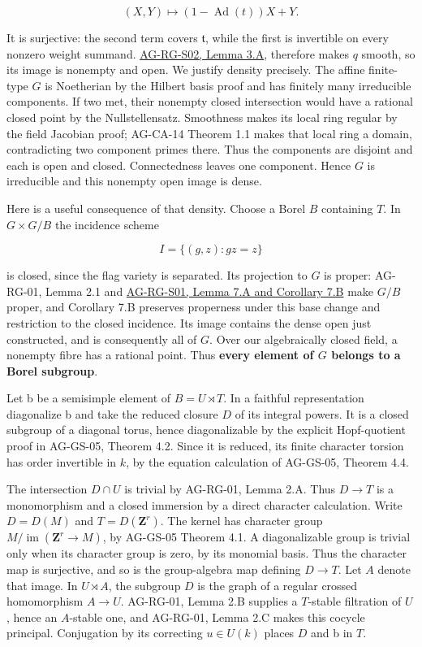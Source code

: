 \documentclass[11pt,a4paper,openany]{report}
\newcounter{none}
\begin{document}
\[
(X,Y)\longmapsto (1-\operatorname{Ad}(t))X+Y.
\]

It is surjective: the second term covers \(\mathfrak t\), while the first is invertible on every nonzero weight summand. \href{AG-RG-S02.html\#smooth-map-differential}{AG-RG-S02, Lemma 3.A}, therefore makes \(q\) smooth, so its image is nonempty and open. We justify density precisely. The affine finite-type \(G\) is Noetherian by the Hilbert basis proof and has finitely many irreducible components. If two met, their nonempty closed intersection would have a rational closed point by the Nullstellensatz. Smoothness makes its local ring regular by the field Jacobian proof; AG-CA-14 Theorem 1.1 makes that local ring a domain, contradicting two component primes there. Thus the components are disjoint and each is open and closed. Connectedness leaves one component. Hence \(G\) is irreducible and this nonempty open image is dense.

Here is a useful consequence of that density. Choose a Borel \(B\) containing \(T\). In \(G\times G/B\) the incidence scheme

\[
I=\{(g,z):gz=z\}
\]

is closed, since the flag variety is separated. Its projection to \(G\) is proper: AG-RG-01, Lemma 2.1 and \href{AG-RG-S01.html\#projective-properness}{AG-RG-S01, Lemma 7.A and Corollary 7.B} make \(G/B\) proper, and Corollary 7.B preserves properness under this base change and restriction to the closed incidence. Its image contains the dense open just constructed, and is consequently all of \(G\). Over our algebraically closed field, a nonempty fibre has a rational point. Thus \textbf{every element of \(G\) belongs to a Borel subgroup}.

Let b be a semisimple element of \(B=U\rtimes T\). In a faithful representation diagonalize b and take the reduced closure \(D\) of its integral powers. It is a closed subgroup of a diagonal torus, hence diagonalizable by the explicit Hopf-quotient proof in AG-GS-05, Theorem 4.2. Since it is reduced, its finite character torsion has order invertible in \(k\), by the equation calculation of AG-GS-05, Theorem 4.4.

The intersection \(D\cap U\) is trivial by AG-RG-01, Lemma 2.A. Thus \(D\to T\) is a monomorphism and a closed immersion by a direct character calculation. Write \(D=D(M)\) and \(T=D(\mathbf Z^r)\). The kernel has character group \(M/\operatorname{im}(\mathbf Z^r\to M)\), by AG-GS-05 Theorem 4.1. A diagonalizable group is trivial only when its character group is zero, by its monomial basis. Thus the character map is surjective, and so is the group-algebra map defining \(D\to T\). Let \(A\) denote that image. In \(U\rtimes A\), the subgroup \(D\) is the graph of a regular crossed homomorphism \(A\to U\). AG-RG-01, Lemma 2.B supplies a \(T\)-stable filtration of \(U\), hence an \(A\)-stable one, and AG-RG-01, Lemma 2.C makes this cocycle principal. Conjugation by its correcting \(u\in U(k)\) places \(D\) and b in \(T\).
\end{document}
